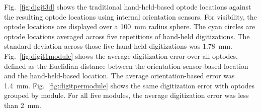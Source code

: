 Fig.~\ref{fig:digit3d} shows the traditional hand-held-based optode locations against the resulting optode locations using internal orientation sensors. For visibility, the optode locations are displayed over a 100~mm radius sphere. The cyan circles are optode locations averaged across five repetitions of hand-held digitizations. The standard deviation across those five hand-held digitizations was 1.78~mm. Fig.~\ref{fig:digit1module} shows the average digitization error over all optodes, defined as the Euclidian distance between the orientation-sensor-based location and the hand-held-based location. The average orientation-based error was 1.4~mm. Fig.~\ref{fig:digitpermodule} shows the same digitization error with optodes grouped by module. For all five modules, the average digitization error was less than 2~mm.  


